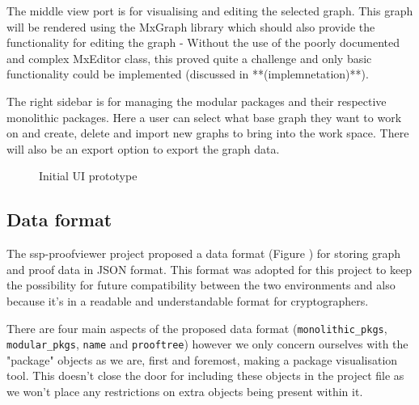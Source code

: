 \documentclass[bsc,frontabs,singlespacing,parskip,deptreport]{infthesis}
\begin{document}

The middle view port is for visualising and editing the selected graph. This graph will be rendered using the MxGraph library which should also provide the functionality for editing the graph - Without the use of the poorly documented and complex MxEditor class, this proved quite a challenge and only basic functionality could be implemented (discussed in **(implemnetation)**). 
 
The right sidebar is for managing the modular packages and their respective monolithic packages. Here a user can select what base graph they want to work on and create, delete and import new graphs to bring into the work space. There will also be an export option to export the graph data. 

\begin{figure}
    \centering
    \caption{Initial UI prototype}
    \label{fig:lowfid}
\end{figure}

\subsection{Data format}
The ssp-proofviewer project \cite{Puniamurthy2021} proposed a data format (Figure \cite{code:df}) for storing graph and proof data in JSON format. This format was adopted for this project to keep the possibility for future compatibility between the two environments and also because it's in a readable and understandable format for cryptographers.

There are four main aspects of the proposed data format (\texttt{monolithic\_pkgs}, \texttt{modular\_pkgs}, \texttt{name} and \texttt{prooftree}) however we only concern ourselves with the "package" objects as we are, first and foremost, making a package visualisation tool. This doesn't close the door for including these objects in the project file as we won't place any restrictions on extra objects being present within it. 
\end{document}
